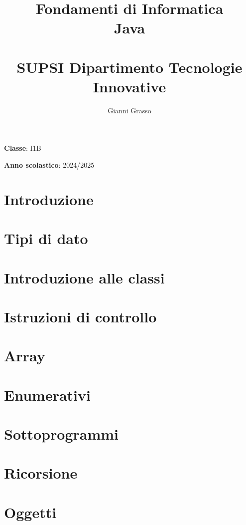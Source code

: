 \documentclass{article}
\title{
    Fondamenti di Informatica \\
    Java \\
    \phantom{}\\
    \large SUPSI Dipartimento Tecnologie Innovative
}
\author{Gianni Grasso}
\begin{document}
\maketitle
\hphantom{ }
\vspace{14.5cm}

\textbf{Classe}: I1B

\textbf{Anno scolastico}: 2024/2025
\pagebreak


\tableofcontents
\pagebreak

\section{Introduzione}

\pagebreak

\section{Tipi di dato}

\pagebreak

\section{Introduzione alle classi}

\pagebreak

\section{Istruzioni di controllo}

\pagebreak

\section{Array}

\pagebreak

\section{Enumerativi}

\pagebreak

\section{Sottoprogrammi}

\pagebreak

\section{Ricorsione}

\pagebreak

\section{Oggetti}

\pagebreak
\end{document}
